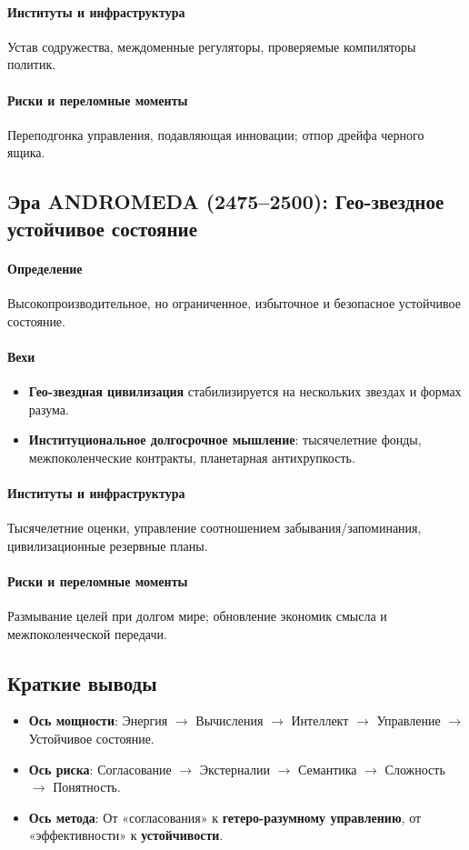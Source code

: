 \documentclass[11pt]{article}
\begin{document}
\paragraph{Институты и инфраструктура} Устав содружества, междоменные регуляторы, проверяемые компиляторы политик.

\paragraph{Риски и переломные моменты} Переподгонка управления, подавляющая инновации; отпор дрейфа черного ящика.

\subsection{Эра ANDROMEDA (2475–2500): Гео-звездное устойчивое состояние}
\paragraph{Определение} Высокопроизводительное, но ограниченное, избыточное и безопасное устойчивое состояние.

\paragraph{Вехи}
\begin{itemize}[noitemsep]
  \item \textbf{Гео-звездная цивилизация} стабилизируется на нескольких звездах и формах разума.
  \item \textbf{Институциональное долгосрочное мышление}: тысячелетние фонды, межпоколенческие контракты, планетарная антихрупкость.
\end{itemize}

\paragraph{Институты и инфраструктура} Тысячелетние оценки, управление соотношением забывания/запоминания, цивилизационные резервные планы.

\paragraph{Риски и переломные моменты} Размывание целей при долгом мире; обновление экономик смысла и межпоколенческой передачи.

\subsection{Краткие выводы}
\begin{itemize}[noitemsep]
  \item \textbf{Ось мощности}: Энергия $\rightarrow$ Вычисления $\rightarrow$ Интеллект $\rightarrow$ Управление $\rightarrow$ Устойчивое состояние.
  \item \textbf{Ось риска}: Согласование $\rightarrow$ Экстерналии $\rightarrow$ Семантика $\rightarrow$ Сложность $\rightarrow$ Понятность.
  \item \textbf{Ось метода}: От «согласования» к \textbf{гетеро-разумному управлению}, от «эффективности» к \textbf{устойчивости}.
\end{itemize}
\end{document}
